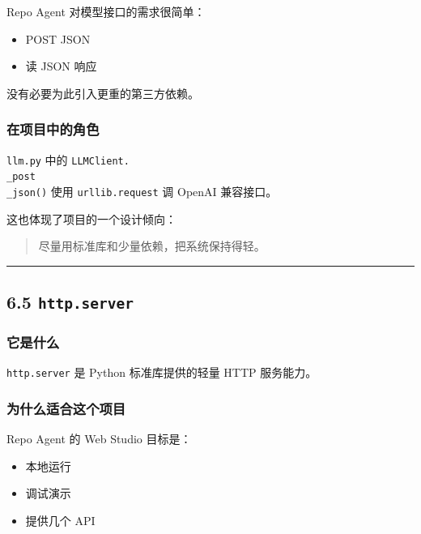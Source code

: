 \documentclass[UTF8,12pt,openany]{ctexbook}
\begin{document}
Repo Agent 对模型接口的需求很简单：\par

\begin{itemize}
\item POST JSON
\item 读 JSON 响应
\end{itemize}

没有必要为此引入更重的第三方依赖。\par

\subsubsection{在项目中的角色}

\texttt{llm.py} 中的 \texttt{LLMClient.\\_post\\_json()} 使用 \texttt{urllib.request} 调 OpenAI 兼容接口。\par

这也体现了项目的一个设计倾向：\par

\begin{quote}
尽量用标准库和少量依赖，把系统保持得轻。
\end{quote}

\hrule

\subsection{6.5 \texttt{http.server}}

\subsubsection{它是什么}

\texttt{http.server} 是 Python 标准库提供的轻量 HTTP 服务能力。\par

\subsubsection{为什么适合这个项目}

Repo Agent 的 Web Studio 目标是：\par

\begin{itemize}
\item 本地运行
\item 调试演示
\item 提供几个 API
\end{itemize}
\end{document}

